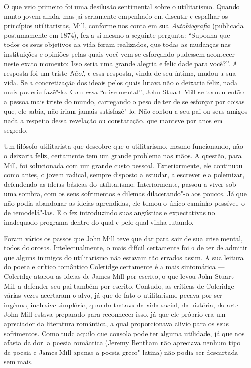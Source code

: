 O que veio primeiro foi uma desilusão sentimental sobre o utilitarismo.
Quando muito jovem ainda, mas já seriamente empenhado em discutir e 
espalhar os princípios utilitaristas, Mill, conforme nos conta em sua
\textit{Autobiografia} (publicada postumamente em 1874), fez a si mesmo 
a seguinte pergunta: ``Suponha que todos os seus objetivos na vida foram realizados,
que todas as mudanças nas instituições e opiniões pelas quais você vem
se esforçando pudessem acontecer neste exato momento: Isso seria uma
grande alegria e felicidade para você?''. A resposta foi um triste
\textit{Não!}, e essa resposta, vinda de seu íntimo, mudou a sua vida.
Se a concretização dos ideais pelos quais lutava não o deixaria feliz,
nada mais poderia fazê"-lo. Com essa ``crise mental'', John Stuart Mill
se tornou então a pessoa mais triste do mundo, carregando o peso de ter
de se esforçar por coisas que, ele sabia, não iriam jamais
satisfazê"-lo. Não contou a seu pai ou seus amigos nada a respeito
dessa revelação ou constatação, que manteve por anos em segredo.

Um filósofo utilitarista que descobre que o utilitarismo, mesmo
funcionando, não o deixaria feliz, certamente tem um grande problema
nas mãos. A questão, para Mill, foi solucionada com um grande custo
pessoal. Exteriormente, ele continuou como antes, o jovem radical,
sempre disposto a estudar, a escrever e a polemizar, defendendo as
ideias básicas do utilitarismo. Interiormente, passou a viver sob uma
sombra, com os seus sofrimentos e dilemas dilacerando"-o aos poucos.
Já que não podia abandonar as ideias aprendidas, ele tomou o único
caminho possível, o de remodelá"-las. E o fez introduzindo suas
\mbox{angústias} e expectativas no inadequado programa dentro do qual e pelo
qual vinha lutando.

Foram vários os passos que John Mill teve que dar para sair de sua crise
mental, todos dolorosos. Intelectualmente, o mais difícil certamente
foi o de ter de admitir que alguns inimigos do utilitarismo não estavam
tão errados assim. A sua leitura do poeta e crítico romântico Coleridge
certamente é a mais sintomática --- Coleridge atacou as ideias de James
Mill por escrito, o que levou John Stuart Mill a defender seu pai
também por escrito. Contudo, as críticas de Coleridge várias vezes
acertaram o alvo, já que de fato o utilitarismo pecava por ser ingênuo,
inclusive simplório, quando tratava da vida social, da história, da
arte. John Mill estava preparado para reconhecer isso, já que ele
próprio era um apreciador da literatura romântica, a qual proporcionava
alívio para os seus sofrimentos. Como tudo aquilo que consola pode ter
alguma utilidade, já que nos afasta da dor, a poesia romântica (Jeremy
Bentham não apreciava nenhum tipo de poesia e James Mill apenas a poesia
greco"-latina) não podia ser descartada sem mais. 


